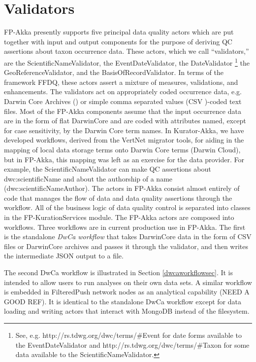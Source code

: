 \documentclass{article}
\begin{document}
\section{Validators}
FP-Akka presently supports five principal data quality actors which are put together with input and output components for the purpose of deriving QC assertions about taxon occurrence data.  
These actors, which we call ``validators,'' are the ScientificNameValidator, the EventDateValidator, the DateValidator
\footnote{See, e.g. http://rs.tdwg.org/dwc/terms/\#Event for date forms available to the EventDateValidator and http://rs.tdwg.org/dwc/terms/\#Taxon for some data available to the ScientificNameValidator.}
 the GeoReferenceValidator, and the BasisOfRecordValidator.  In terms of the framework FFDQ, these actors assert a mixture of measures, validations, and enhancements.  
The validators act on appropriately coded occurrence data, e.g. Darwin Core Archives 
(\citep{robertson_dwca_2015}) 
 or simple comma separated values (CSV \citep{ietf4180})-coded text files.
Most of the FP-Akka components assume that the input occurrence data are in the form of flat DarwinCore and are coded with attributes named, except for case sensitivity, by the Darwin Core term names.
In Kurator-Akka, we have developed workflows, derived from the VertNet migrator tools, for aiding in the mapping of local data storage terms onto Darwin Core terms (Darwin Cloud), but in FP-Akka, this mapping was left as an exercise for the data provider.
For example, the ScientificNameValidator can make QC assertions about dwc:scientificName and about the authorship of a name (dwc:scientificNameAuthor).  The actors in FP-Akka consist almost entirely of code that manages the flow of data and data quality assertions through the workflow.  All of the business logic of data quality control is separated into classes in the FP-KurationServices module.   The FP-Akka actors are composed into workflows.  Three workflows are in current production use in FP-Akka. The first is the standalone \emph{DwCa workflow} that takes DarwinCore data in the form of CSV files or DarwinCore archives and passes it through 
the validator, and then writes the intermediate JSON output to a file. 

The second DwCa workflow is illustrated in Section \ref{dwcaworkflowsec}.  It is intended to allow users to run analyses on their own data sets.  A similar workflow is embedded in FilteredPush network nodes as an analytical capability (NEED A GOOD REF).  It is identical to the standalone DwCa workflow except for data loading and writing actors that interact with MongoDB \citep{mongodb_inc_mongodb_2015} instead of the filesystem. 
\end{document}
